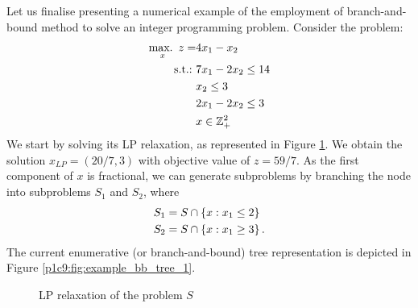 Let us finalise presenting a numerical example of the employment of branch-and-bound method to solve an integer programming problem. Consider the problem:
%
\begin{align*}
    \mathop{\text{max.~}}_x z = & 4x_1 - x_2 \\
    \mathop{\text{s.t.:~}} & 7x_1 - 2x_2 \leq 14 \\
    &x_2 \leq 3 \\
    &2x_1 - 2x_2 \leq 3 \\
    &x \in \mathbb{Z}^2_+
\end{align*} 
%
We start by solving its LP relaxation, as represented in Figure \ref{p1c9:fig:example_LP_relaxation_solution}. We obtain the solution $x_{LP}=(20/7, 3)$ with objective value of $z=59/7$. As the first component of $x$ is fractional, we can generate subproblems by branching the node into subproblems $S_1$ and $S_2$, where
%
\begin{align*}
	& S_1 = S \cap \left\{ x : x_1 \leq 2 \right \} \\
	& S_2 = S \cap \left\{ x : x_1 \geq 3 \right \}.
\end{align*}
%
The current enumerative (or branch-and-bound) tree representation is depicted in Figure \ref{p1c9:fig:example_bb_tree_1}.

\begin{figure}[h]
	\caption{LP relaxation of the problem $S$}\label{p1c9:fig:example_LP_relaxation_solution}	
\end{figure}


